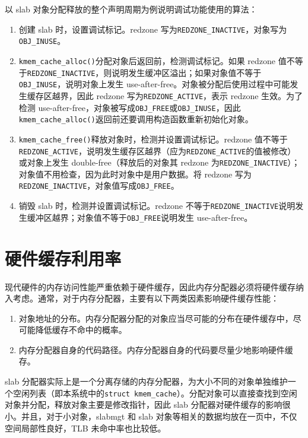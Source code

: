 \documentclass[AutoFakeBold]{LZUThesis}
\begin{document}
\begin{sloppypar}
以 slab 对象分配释放的整个声明周期为例说明调试功能使用的算法：

\begin{enumerate}
\def\labelenumi{\arabic{enumi}.}
\item
  创建 slab 时，设置调试标记。redzone
  写为\texttt{REDZONE\_INACTIVE}，对象写为\texttt{OBJ\_INUSE}。
\item
  \texttt{kmem\_cache\_alloc()}分配对象后返回前，检测调试标记。如果
  redzone
  值不等于\texttt{REDZONE\_INACTIVE}，则说明发生缓冲区溢出；如果对象值不等于\texttt{OBJ\_INUSE}，说明对象上发生
  use-after-free。对象被分配后使用过程中可能发生缓存区越界，因此 redzone
  写为\texttt{REDZONE\_ACTIVE}，表示 redzone 生效。为了检测
  use-after-free，对象被写成\texttt{OBJ\_FREE}或\texttt{OBJ\_INUSE}，因此\texttt{kmem\_cache\_alloc()}返回前还要调用构造函数重新初始化对象。
\item
  \texttt{kmem\_cache\_free()}释放对象时，检测并设置调试标记。redzone
  值不等于\texttt{REDZONE\_ACTIVE}，说明发生缓存区越界（应为\texttt{REDZONE\_ACTIVE}的值被修改）或对象上发生
  double-free（释放后的对象其 redzone
  为\texttt{REDZONE\_INACTIVE}）；对象值不用检查，因为此时对象中是用户数据。将
  redzone 写为\texttt{REDZONE\_INACTIVE}，对象值写成\texttt{OBJ\_FREE}。
\item
  销毁 slab 时，检测并设置调试标记。redzone
  不等于\texttt{REDZONE\_INACTIVE}说明发生缓冲区越界；对象值不等于\texttt{OBJ\_FREE}说明发生
  use-after-free。
\end{enumerate}


\section{硬件缓存利用率}\label{sec:hw-cache-efficiency}

现代硬件的内存访问性能严重依赖于硬件缓存，因此内存分配器必须将硬件缓存纳入考虑。通常，对于内存分配器，主要有以下两类因素影响硬件缓存性能：

\begin{enumerate}
\def\labelenumi{\arabic{enumi}.}
\item
  对象地址的分布。内存分配器分配的对象应当尽可能的分布在硬件缓存中，尽可能降低缓存不命中的概率。
\item
  内存分配器自身的代码路径。内存分配器自身的代码要尽量少地影响硬件缓存。
\end{enumerate}

slab
分配器实际上是一个分离存储的内存分配器，为大小不同的对象单独维护一个空闲列表（即本系统中的\texttt{struct\ kmem\_cache}）。分配对象可以直接查找到空闲对象并分配，释放对象主要是修改指针，因此
slab 分配器对硬件缓存的影响很小。并且，对于小对象，slabmgt 和 slab
对象等相关的数据均放在一页中，不仅空间局部性良好，TLB 未命中率也比较低。


\end{sloppypar}
\end{document}

